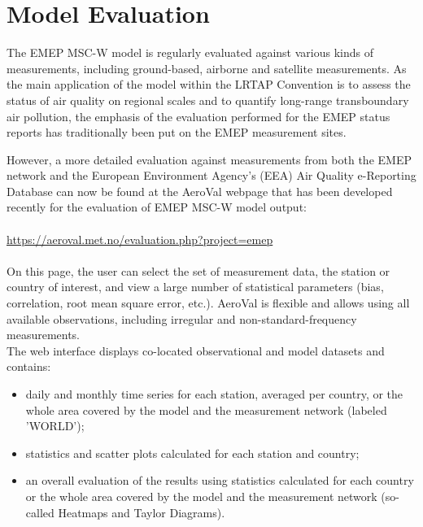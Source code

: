 \setcounter{page}{1}

\cleardoublepage
\chapter[2019 Model Evaluation]{Model Evaluation}
\label{ch:appx_modeleval}


The EMEP MSC-W model is regularly evaluated against various kinds of measurements, including ground-based, airborne and satellite measurements.
As the main application of the model within the LRTAP Convention is to assess the status of air quality on regional scales and to quantify long-range transboundary air pollution, the emphasis of the evaluation performed for the EMEP status reports has traditionally been put on the EMEP measurement sites.

However, a more detailed evaluation against measurements from both the EMEP network and the European Environment Agency's (EEA) Air Quality e-Reporting Database can now be found at the AeroVal webpage that has been developed recently for the evaluation
of EMEP MSC-W model output:\\
\\
\url{https://aeroval.met.no/evaluation.php?project=emep}\\
\\
On this page, the user can select the set of measurement data, the
station or country of interest, and view a large number of statistical
parameters (bias, correlation, root mean square error, etc.). AeroVal is flexible and allows using all available observations, including irregular and non-standard-frequency measurements.
\\
The web interface displays co-located observational and model datasets
and contains:
\begin{itemize}

\item daily and monthly time series for each station, averaged per
  country, or the whole area covered by the model and
  the measurement network (labeled 'WORLD');
\item statistics and scatter plots calculated for each station and country;
\item an overall evaluation of the results using statistics calculated for
  each country or the whole area covered by the model and the measurement
  network (so-called Heatmaps and Taylor Diagrams).
\end{itemize}

